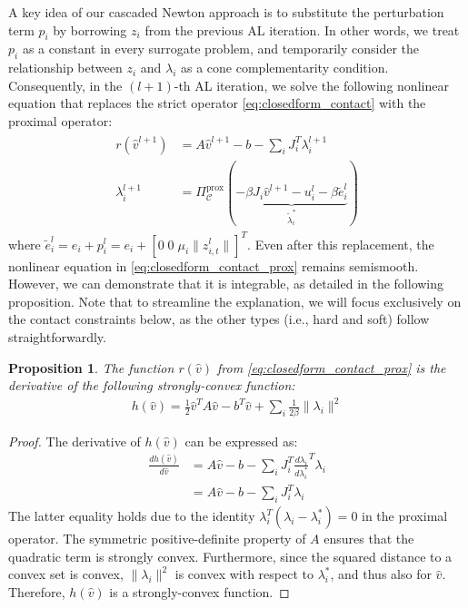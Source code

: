\documentclass[lettersize,journal]{IEEEtran}
\newtheorem{proposition}{Proposition}
\begin{document}
A key idea of our cascaded Newton approach is to substitute the perturbation term $p_i$ by borrowing $z_i$ from the previous AL iteration. 
In other words, we treat $p_i$ as a constant in every surrogate problem, and temporarily consider the relationship between $z_i$ and $\lambda_i$ as a cone complementarity condition. 
Consequently, in the $(l+1)$-th AL iteration, we solve the following nonlinear equation that replaces the strict operator \eqref{eq:closedform_contact} with the proximal operator:
\begin{align} \label{eq:closedform_contact_prox}
\begin{split}
    r(\hat{v}^{l+1}) &= A\hat{v}^{l+1}-b -\sum_i J_i^T\lambda_i^{l+1} \\
    \lambda_i^{l+1} &= \Pi_{\mathcal{C}}^\text{prox} (\underbrace{-\beta J_i\hat{v}^{l+1}-u_i^l-\beta\tilde{e}_i^l}_{\tilde{\lambda}_i^*}) 
\end{split}
\end{align}
where $\tilde{e}_i^l = e_i + p_i^l = e_i + \left[0 \; 0 \; \mu_i \| z_{i,t}^l \|\right]^T$.
Even after this replacement, the nonlinear equation in \eqref{eq:closedform_contact_prox} remains semismooth. However, we can demonstrate that it is integrable, as detailed in the following proposition. Note that to streamline the explanation, we will focus exclusively on the contact constraints below, as the other types (i.e., hard and soft) follow straightforwardly.
\begin{proposition}
    The function $r(\hat{v})$ from \eqref{eq:closedform_contact_prox} is the derivative of the following strongly-convex function:
    \begin{align} \label{eq:canal_convex_objective}
    h(\hat{v}) = \frac{1}{2} \hat{v}^T A \hat{v} - b^T \hat{v} + \sum_i \frac{1}{2\beta} \| \lambda_i \|^2
    \end{align}
\end{proposition}
\begin{proof}
    The derivative of $h(\hat{v})$ can be expressed as:
    \begin{align*}
        \frac{dh(\hat{v})}{d\hat{v}} 
        &= A \hat{v} - b - \sum_i J_i^T \frac{d\lambda_i}{d\lambda_i^*}^T \lambda_i \\
        &= A \hat{v} - b - \sum_i J_i^T \lambda_i
    \end{align*}
    The latter equality holds due to the identity $\lambda_i^T(\lambda_i - \lambda_i^*) = 0$ in the proximal operator. 
    The symmetric positive-definite property of $A$ ensures that the quadratic term is strongly convex.
    Furthermore, since the squared distance to a convex set is convex, $\| \lambda_i \|^2$ is convex with respect to $\lambda_i^*$, and thus also for $\hat{v}$.
    Therefore, $h(\hat{v})$ is a strongly-convex function.
\end{proof}
\end{document}
